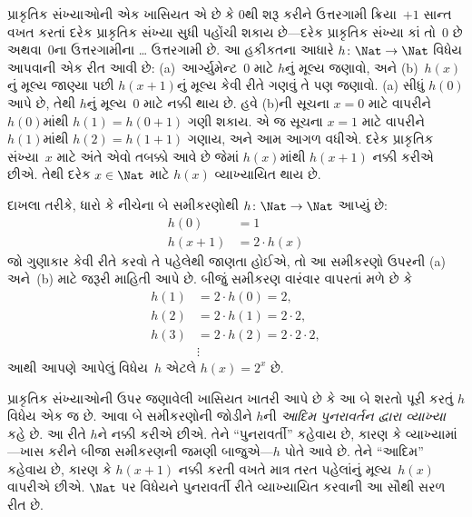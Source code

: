 \documentclass[../../../include/open-logic-section]{subfiles}
\begin{document}

પ્રાકૃતિક સંખ્યાઓની એક ખાસિયત એ છે કે $0$થી શરૂ કરીને ઉત્તરગામી
ક્રિયા~$+1$ સાન્ત વખત કરતાં દરેક પ્રાકૃતિક સંખ્યા સુધી પહોંચી શકાય
છે---દરેક પ્રાકૃતિક સંખ્યા કાં તો~$0$ છે અથવા~$0$ના ઉત્તરગામીના
\dots{} ઉત્તરગામી છે. આ હકીકતના આધારે $h\colon\Nat \to \Nat$
વિધેય આપવાની એક રીત આવી છે: (a)~આર્ગ્યુમેન્ટ~$0$ માટે $h$નું મૂલ્ય
જણાવો, અને (b)~$h(x)$નું મૂલ્ય જાણ્યા પછી $h(x+1)$નું મૂલ્ય કેવી રીતે
ગણવું તે પણ જણાવો. (a) સીધું $h(0)$ આપે છે, તેથી $h$નું મૂલ્ય~$0$ માટે
નક્કી થાય છે. હવે (b)ની સૂચના $x=0$ માટે વાપરીને~$h(0)$માંથી
$h(1) = h(0+1)$ ગણી શકાય. એ જ સૂચના $x=1$ માટે વાપરીને~$h(1)$માંથી
$h(2) = h(1+1)$ ગણાય, અને આમ આગળ વધીએ. દરેક પ્રાકૃતિક સંખ્યા~$x$
માટે અંતે એવો તબક્કો આવે છે જેમાં $h(x)$માંથી $h(x+1)$ નક્કી કરીએ
છીએ. તેથી દરેક $x \in \Nat$ માટે $h(x)$ વ્યાખ્યાયિત થાય છે.


દાખલા તરીકે, ધારો કે નીચેના બે સમીકરણોથી $h\colon \Nat \to \Nat$
આપ્યું છે:
\begin{align*}
h(0) & =  1\\
h(x+1) & =  2 \cdot h(x)
\end{align*}
જો ગુણાકાર કેવી રીતે કરવો તે પહેલેથી જાણતા હોઈએ, તો આ સમીકરણો ઉપરની
(a) અને~(b) માટે જરૂરી માહિતી આપે છે. બીજું સમીકરણ વારંવાર વાપરતાં
મળે છે કે
\begin{align*}
  h(1) & = 2\cdot h(0) = 2,\\
  h(2) & = 2\cdot h(1) = 2\cdot 2,\\
  h(3) & = 2 \cdot h(2) = 2\cdot 2 \cdot 2,\\
  & \vdots
\end{align*}
આથી આપણે આપેલું વિધેય~$h$ એટલે $h(x) = 2^x$ છે.

પ્રાકૃતિક સંખ્યાઓની ઉપર જણાવેલી ખાસિયત ખાતરી આપે છે કે આ બે શરતો
પૂરી કરતું $h$ વિધેય એક જ છે. આવા બે સમીકરણોની જોડીને $h$ની
\emph{આદિમ પુનરાવર્તન દ્વારા વ્યાખ્યા} કહે છે. આ રીતે $h$ને
નક્કી કરીએ છીએ. તેને ``પુનરાવર્તી''
કહેવાય છે, કારણ કે વ્યાખ્યામાં---ખાસ કરીને બીજા સમીકરણની જમણી
બાજુએ---$h$ પોતે આવે છે. તેને ``આદિમ'' કહેવાય છે, કારણ કે
$h(x+1)$ નક્કી કરતી વખતે માત્ર તરત પહેલાંનું મૂલ્ય~$h(x)$ વાપરીએ
છીએ. $\Nat$ પર વિધેયને પુનરાવર્તી રીતે વ્યાખ્યાયિત કરવાની આ સૌથી
સરળ રીત છે.
\end{document}
